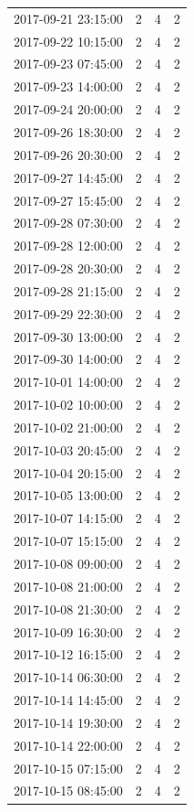 \begin{tabular}{lrrr}
2017-09-21 23:15:00 & 2 & 4 & 2 \\
2017-09-22 10:15:00 & 2 & 4 & 2 \\
2017-09-23 07:45:00 & 2 & 4 & 2 \\
2017-09-23 14:00:00 & 2 & 4 & 2 \\
2017-09-24 20:00:00 & 2 & 4 & 2 \\
2017-09-26 18:30:00 & 2 & 4 & 2 \\
2017-09-26 20:30:00 & 2 & 4 & 2 \\
2017-09-27 14:45:00 & 2 & 4 & 2 \\
2017-09-27 15:45:00 & 2 & 4 & 2 \\
2017-09-28 07:30:00 & 2 & 4 & 2 \\
2017-09-28 12:00:00 & 2 & 4 & 2 \\
2017-09-28 20:30:00 & 2 & 4 & 2 \\
2017-09-28 21:15:00 & 2 & 4 & 2 \\
2017-09-29 22:30:00 & 2 & 4 & 2 \\
2017-09-30 13:00:00 & 2 & 4 & 2 \\
2017-09-30 14:00:00 & 2 & 4 & 2 \\
2017-10-01 14:00:00 & 2 & 4 & 2 \\
2017-10-02 10:00:00 & 2 & 4 & 2 \\
2017-10-02 21:00:00 & 2 & 4 & 2 \\
2017-10-03 20:45:00 & 2 & 4 & 2 \\
2017-10-04 20:15:00 & 2 & 4 & 2 \\
2017-10-05 13:00:00 & 2 & 4 & 2 \\
2017-10-07 14:15:00 & 2 & 4 & 2 \\
2017-10-07 15:15:00 & 2 & 4 & 2 \\
2017-10-08 09:00:00 & 2 & 4 & 2 \\
2017-10-08 21:00:00 & 2 & 4 & 2 \\
2017-10-08 21:30:00 & 2 & 4 & 2 \\
2017-10-09 16:30:00 & 2 & 4 & 2 \\
2017-10-12 16:15:00 & 2 & 4 & 2 \\
2017-10-14 06:30:00 & 2 & 4 & 2 \\
2017-10-14 14:45:00 & 2 & 4 & 2 \\
2017-10-14 19:30:00 & 2 & 4 & 2 \\
2017-10-14 22:00:00 & 2 & 4 & 2 \\
2017-10-15 07:15:00 & 2 & 4 & 2 \\
2017-10-15 08:45:00 & 2 & 4 & 2 \\

\end{tabular}

